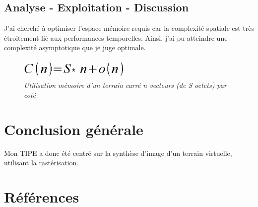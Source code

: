 \documentclass[12pt]{article}
\begin{document}
		\subsection{Analyse - Exploitation - Discussion}
		J'ai cherché à optimiser l'espace mémoire requis car la complexité spatiale est très étroitement lié aux performances temporelles.
		Ainsi, j'ai pu atteindre une complexité asymptotique que je juge optimale.
		\begin{figure}[!h]
			\begin{center}
				\includegraphics[height=1cm,keepaspectratio]{../images/complexity.png}
			\end{center}
			\caption{\textit{Utilisation mémoire d'un terrain carré n vecteurs (de S octets)  par coté}}
			\label{Utilisation mémoire du terrain 2}
		\end{figure}
	\newpage
	\section{Conclusion générale}
	Mon TIPE a donc été centré sur la synthèse d'image d'un terrain virtuelle, utilisant la rastérisation.
	\newline

	\newpage
	\section{Références}
\end{document}
